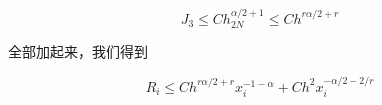 \documentclass{ctexart}
\begin{document}
\begin{equation}
    J_3 \le C h_{2N}^{\alpha/2+1} \le C h^{r\alpha/2+r}
\end{equation}


全部加起来，我们得到

\begin{equation}
    R_i \le C h^{r\alpha/2+r}x_i^{-1-\alpha} + Ch^2 x_i^{-\alpha/2-2/r}
\end{equation}













\end{document}
